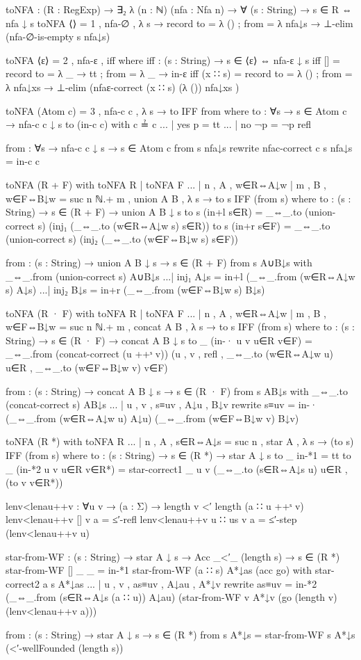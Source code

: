\begin{agda}
toNFA : (R : RegExp)
    → ∃₂ λ (n : ℕ) (nfa : Nfa n)
      → ∀ (s : String)
      → s ∈ R ⇔ nfa ↓ s
toNFA ⟨⟩ = 1 , nfa-∅ , λ s → record
    { to = λ ()
    ; from = λ nfa↓s → ⊥-elim (nfa-∅-is-empty s nfa↓s)
    }

toNFA ⟨ε⟩ = 2 , nfa-ε , iff
  where
  iff : (s : String)
    → s ∈ ⟨ε⟩ ⇔ nfa-ε ↓ s
  iff [] = record { to = λ _ → tt ; from = λ _ → in-ε }
  iff (x ∷ s) = record
    { to = λ ()
    ; from = λ nfa↓xs → ⊥-elim (nfaε-correct (x ∷ s) (λ ()) nfa↓xs )
    }

toNFA (Atom c) = 3 , nfa-c c , λ s → to IFF from
  where
  to : ∀{s}
    → s ∈ Atom c
    → nfa-c c ↓ s
  to (in-c c) with c ≟ c
  ... | yes p = tt
  ... | no ¬p = ¬p refl

  from : ∀{s}
    → nfa-c c ↓ s
    → s ∈ Atom c
  from {s} nfa↓s rewrite nfac-correct {c} {s} nfa↓s = in-c c

toNFA (R + F) with toNFA R | toNFA F
... | n , A , w∈R⇔A↓w | m , B , w∈F⇔B↓w =
  suc n ℕ.+ m , union A B , λ s → to s IFF (from s)
  where
  to :  (s : String)
    → s ∈ (R + F)
    → union A B ↓ s
  to s (in+l s∈R)
    = _⇔_.to (union-correct s) (inj₁ (_⇔_.to (w∈R⇔A↓w s) s∈R))
  to s (in+r s∈F)
    = _⇔_.to (union-correct s) (inj₂ (_⇔_.to (w∈F⇔B↓w s) s∈F))

  from : (s : String)
    → union A B ↓ s
    → s ∈ (R + F)
  from s A∪B↓s with _⇔_.from (union-correct s) A∪B↓s
  ...| inj₁ A↓s = in+l (_⇔_.from (w∈R⇔A↓w s) A↓s)
  ...| inj₂ B↓s = in+r (_⇔_.from (w∈F⇔B↓w s) B↓s)

toNFA (R · F) with toNFA R | toNFA F
... | n , A , w∈R⇔A↓w | m , B , w∈F⇔B↓w =
  suc n ℕ.+ m , concat A B , λ s → to s IFF (from s)
  where
  to : (s : String)
    → s ∈ (R · F)
    → concat A B ↓ s
  to _ (in-· {u} {v} u∈R v∈F) =
    _⇔_.from (concat-correct (u ++ˢ v))
      (u
      , v
      , refl
      , _⇔_.to (w∈R⇔A↓w u) u∈R
      , _⇔_.to (w∈F⇔B↓w v) v∈F)

  from : (s : String)
    → concat A B ↓ s
    → s ∈ (R · F)
  from s AB↓s with _⇔_.to (concat-correct s) AB↓s
  ... | u , v , s≡uv , A↓u , B↓v rewrite s≡uv =
    in-· (_⇔_.from (w∈R⇔A↓w u) A↓u) (_⇔_.from (w∈F⇔B↓w v) B↓v)

toNFA (R *) with toNFA R
... | n , A , s∈R⇔A↓s =
  suc n , star A , λ s → (to s) IFF (from s)
  where
  to : (s : String)
    → s ∈ (R *)
    → star A ↓ s
  to _ in-*1 = tt
  to _ (in-*2 {u} {v} u∈R v∈R*) =
    star-correct1 {_} {u} {v} (_⇔_.to (s∈R⇔A↓s u) u∈R , (to v v∈R*))

  lenv<lenau++v : ∀{u v} → (a : Σ) → length v <′ length (a ∷ u ++ˢ v)
  lenv<lenau++v {[]} {v} a = ≤′-refl
  lenv<lenau++v {u ∷ us} {v} a = ≤′-step (lenv<lenau++v u)

  star-from-WF : (s : String)
    → star A ↓ s
    → Acc _<′_ (length s)
    → s ∈ (R *)
  star-from-WF [] _ _ = in-*1
  star-from-WF (a ∷ s) A*↓as (acc go) with star-correct2 a s A*↓as
  ... | u , v , as≡uv , A↓au , A*↓v rewrite as≡uv =
    in-*2 (_⇔_.from (s∈R⇔A↓s (a ∷ u)) A↓au)
        (star-from-WF v A*↓v (go (length v) (lenv<lenau++v a)))

  from : (s : String)
    → star A ↓ s
    → s ∈ (R *)
  from s A*↓s = star-from-WF s A*↓s (<′-wellFounded (length s))
\end{agda}
